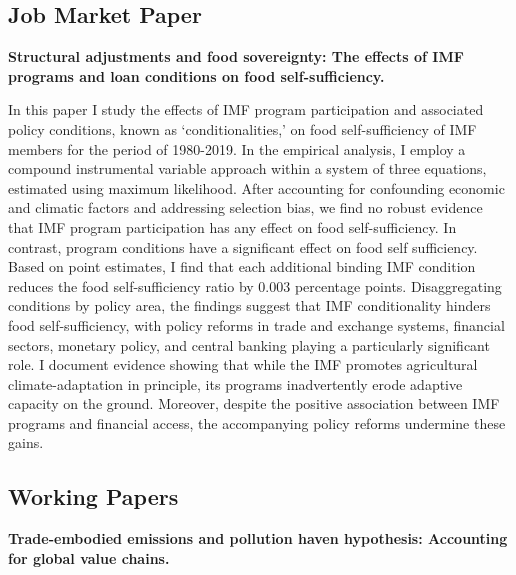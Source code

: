 
\subsection{Job Market Paper}

\textbf{Structural adjustments and food sovereignty: The effects of IMF
programs and loan conditions on food self-sufficiency.}
\vspace{1em}

 \parbox{\textwidth}{In this paper I study the effects of IMF program participation and associated policy conditions, known as ‘conditionalities,’ on food self-sufficiency of IMF members for the period of 1980-2019. In the empirical analysis, I employ a compound instrumental variable approach within a system of three equations, estimated using maximum likelihood. After accounting for confounding economic and climatic factors and addressing selection bias, we find no robust evidence that IMF program participation has any effect on food self-sufficiency. In contrast, program conditions have a significant effect on food self sufficiency. Based on point estimates, I find that each additional binding IMF condition reduces the food self-sufficiency ratio by 0.003 percentage points. Disaggregating conditions by policy area, the findings suggest that IMF conditionality hinders food self-sufficiency, with policy reforms in trade and exchange systems, financial sectors, monetary policy, and central banking playing a particularly significant role. I document evidence showing that while the IMF promotes agricultural climate-adaptation in principle, its programs inadvertently erode adaptive capacity on the ground. Moreover, despite the positive association between IMF programs and financial access, the accompanying policy reforms undermine these gains.}

\subsection{Working Papers}

\textbf{Trade-embodied emissions and pollution haven hypothesis: Accounting for global value chains.}
\vspace{1em}

